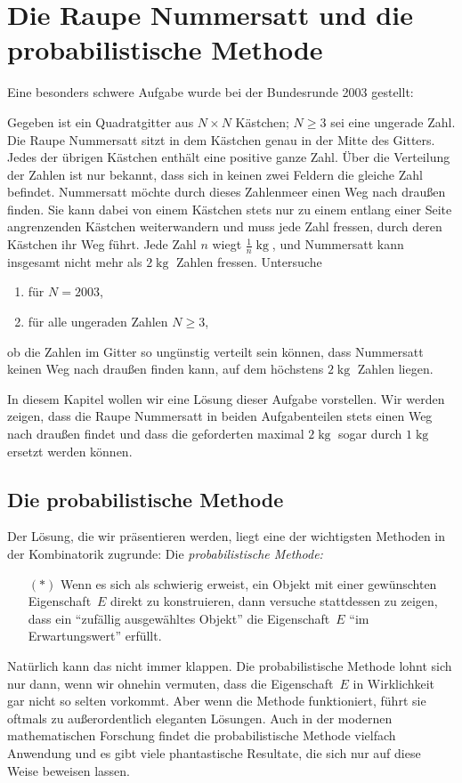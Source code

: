 \section{Die Raupe Nummersatt und die probabilistische Methode}
Eine besonders schwere Aufgabe wurde bei der Bundesrunde 2003 gestellt:

\begin{aufgabe*}[***]\label{aufgabe:RaupeNummersatt}
	Gegeben ist ein Quadratgitter aus $N \times N$ Kästchen; $N\geqslant 3$ sei eine ungerade Zahl.
	Die Raupe Nummersatt sitzt in dem Kästchen genau in der Mitte des Gitters. Jedes der übrigen
	Kästchen enthält eine positive ganze Zahl. Über die Verteilung der Zahlen ist nur bekannt, dass
	sich in keinen zwei Feldern die gleiche Zahl befindet.
	Nummersatt möchte durch dieses Zahlenmeer einen Weg nach draußen finden. Sie kann dabei
	von einem Kästchen stets nur zu einem entlang einer Seite angrenzenden Kästchen weiterwandern
	und muss jede Zahl fressen, durch deren Kästchen ihr Weg führt. Jede Zahl $n$ wiegt $\frac{1}{n}\operatorname{kg}$, und
	Nummersatt kann insgesamt nicht mehr als $2\operatorname{kg}$ Zahlen fressen.
	Untersuche
	\begin{enumerate}[label={$(\alph*)$},ref={$(\alph*)$}]
		\item für $N = 2003$,
		\item für alle ungeraden Zahlen $N\geqslant 3$,
	\end{enumerate}
	ob die Zahlen im Gitter so ungünstig verteilt sein können, dass Nummersatt keinen Weg nach
	draußen finden kann, auf dem höchstens $2\operatorname{kg}$ Zahlen liegen.
\end{aufgabe*}

In diesem Kapitel wollen wir eine Lösung dieser Aufgabe vorstellen. Wir werden zeigen, dass die Raupe Nummersatt in beiden Aufgabenteilen stets einen Weg nach draußen findet und dass die geforderten maximal $2\operatorname{kg}$ sogar durch $1\operatorname{kg}$ ersetzt werden können.

\subsection*{Die probabilistische Methode}

Der Lösung, die wir präsentieren werden, liegt eine der wichtigsten Methoden in der Kombinatorik zugrunde: Die \emph{probabilistische Methode:}
\begin{enumerate}\itshape
	\item[$(*)$] Wenn es sich als schwierig erweist, ein Objekt mit einer gewünschten Eigenschaft~$E$ direkt zu konstruieren, dann versuche stattdessen zu zeigen, dass ein \enquote{zufällig ausgewähltes Objekt} die Eigenschaft~$E$ \enquote{im Erwartungswert} erfüllt.
\end{enumerate}
Natürlich kann das nicht immer klappen. Die probabilistische Methode lohnt sich nur dann, wenn wir ohnehin vermuten, dass die Eigenschaft~$E$ in Wirklichkeit gar nicht so selten vorkommt. Aber wenn die Methode funktioniert, führt sie oftmals zu außerordentlich eleganten Lösungen. Auch in der modernen mathematischen Forschung findet die probabilistische Methode vielfach Anwendung und es gibt viele phantastische Resultate, die sich nur auf diese Weise beweisen lassen.

